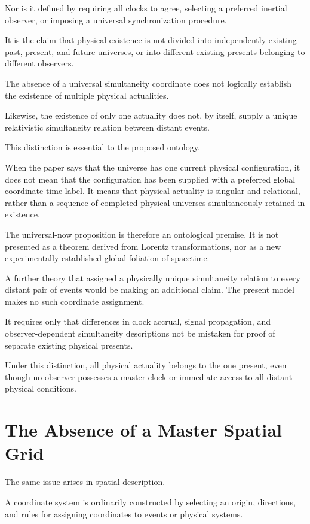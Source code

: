 \documentclass[12pt,onecolumn]{article}
\begin{document}
Nor is it defined by requiring all clocks to agree, selecting a preferred inertial observer, or imposing a universal synchronization procedure.

It is the claim that physical existence is not divided into independently existing past, present, and future universes, or into different existing presents belonging to different observers.

The absence of a universal simultaneity coordinate does not logically establish the existence of multiple physical actualities.

Likewise, the existence of only one actuality does not, by itself, supply a unique relativistic simultaneity relation between distant events.

This distinction is essential to the proposed ontology.

When the paper says that the universe has one current physical configuration, it does not mean that the configuration has been supplied with a preferred global coordinate-time label. It means that physical actuality is singular and relational, rather than a sequence of completed physical universes simultaneously retained in existence.

The universal-now proposition is therefore an ontological premise. It is not presented as a theorem derived from Lorentz transformations, nor as a new experimentally established global foliation of spacetime.

A further theory that assigned a physically unique simultaneity relation to every distant pair of events would be making an additional claim. The present model makes no such coordinate assignment.

It requires only that differences in clock accrual, signal propagation, and observer-dependent simultaneity descriptions not be mistaken for proof of separate existing physical presents.

Under this distinction, all physical actuality belongs to the one present, even though no observer possesses a master clock or immediate access to all distant physical conditions.

\section{The Absence of a Master Spatial Grid}

The same issue arises in spatial description.

A coordinate system is ordinarily constructed by selecting an origin, directions, and rules for assigning coordinates to events or physical systems.
\end{document}
